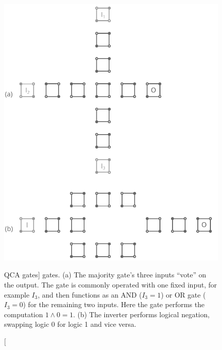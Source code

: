\begin{figure}
  \center
  \includegraphics{gates}
  \caption
[QCA gates]
{
 gates. (a) The majority gate's three inputs ``vote'' on the output. The gate
is commonly operated with one fixed input, for example $I_3$, and then functions
as an AND ($I_3 = 1$) or OR gate ($I_3 = 0$) for the remaining two inputs. Here
the gate performs the computation $1 \land 0 = 1$. (b) The inverter performs
logical negation, swapping logic 0 for logic 1 and vice versa.
}
  \label{fig:gates}
\end{figure}

